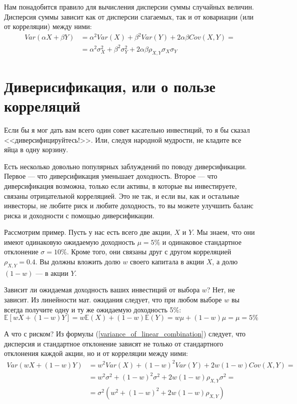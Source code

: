 Нам понадобится правило для вычисления дисперсии суммы случайных величин. Дисперсия суммы зависит как от дисперсии слагаемых, так и от ковариации (или от корреляции) между ними:
\begin{align}
Var(\alpha X + \beta Y) &= \alpha^2 Var(X) + \beta^2 Var(Y) + 2 \alpha \beta Cov(X, Y) = \nonumber \\
&= \alpha^2\sigma_X^2 + \beta^2 \sigma_Y^2 + 2\alpha\beta\rho_{X,Y}\sigma_X\sigma_Y
\label{variance_of_linear_combination}
\end{align}

\section{Диверисификация, или о пользе корреляций}

Если бы я мог дать вам всего один совет касательно инвестиций, то я бы сказал <<диверсифицируйтесь!>>. Или, следуя народной мудрости, не кладите все яйца в одну корзину. 

Есть несколько довольно популярных заблуждений по поводу диверсификации. Первое --- что диверсификация уменьшает доходность. Второе --- что диверсификация возможна, только если активы, в которые вы инвестируете, связаны отрицательной корреляцией. Это не так, и если вы, как и остальные инвесторы, не любите риск и любите доходность, то вы можете улучшить баланс риска и доходности с помощью диверсификации.

Рассмотрим пример. Пусть у нас есть всего две акции, $X$ и $Y$. Мы знаем, что они имеют одинаковую ожидаемую доходность $\mu=5\%$ и одинаковое стандартное отклонение $\sigma=10\%$. Кроме того, они связаны друг с другом корреляцией  $\rho_{X,Y} = 0.4$. Вы должны вложить долю $w$ своего капитала в акции $X$, а долю $(1-w)$ --- в акции $Y$.

Зависит ли ожидаемая доходность ваших инвестиций от выбора $w$? Нет, не зависит. Из линейности мат. ожидания следует, что при любом выборе $w$ вы всегда получите одну и ту же ожидаемую доходность 5\%:
\begin{equation*}
\mathbb{E}\left[ wX + (1-w)Y\right] = w\mathbb{E}(X) + (1-w)\mathbb{E}(Y) = w\mu + (1-w)\mu = \mu = 5\%
\end{equation*}

А что с риском? Из формулы (\ref{variance_of_linear_combination}) следует, что дисперсия и стандартное отклонение зависят не только от стандартного отклонения каждой акции, но и от корреляции между ними:
\begin{align*}
Var(wX + (1-w)Y)
&= w^2Var(X) + (1-w)^2Var(Y) + 2w(1-w)Cov(X,Y) = \\
&= w^2\sigma^2 + (1-w)^2\sigma^2 + 2w(1-w)\rho_{X,Y}\sigma^2 = \\
&= \sigma^2\left(w^2 + (1-w)^2 + 2w(1-w)\rho_{X,Y} \right)
\end{align*}


